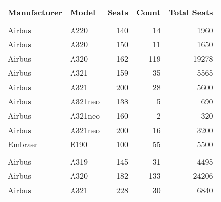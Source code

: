 
\begin{tabular}[t]{llrrr}
\toprule
Manufacturer & Model & Seats & Count & Total Seats\\
\midrule
\addlinespace[0.3em]
\multicolumn{5}{l}{\textbf{JetBlue}}\\
\hspace{1em}Airbus & A220 & 140 & 14 & 1960\\
\hspace{1em}Airbus & A320 & 150 & 11 & 1650\\
\hspace{1em}Airbus & A320 & 162 & 119 & 19278\\
\hspace{1em}Airbus & A321 & 159 & 35 & 5565\\
\hspace{1em}Airbus & A321 & 200 & 28 & 5600\\
\hspace{1em}Airbus & A321neo & 138 & 5 & 690\\
\hspace{1em}Airbus & A321neo & 160 & 2 & 320\\
\hspace{1em}Airbus & A321neo & 200 & 16 & 3200\\
\hspace{1em}Embraer & E190 & 100 & 55 & 5500\\
\addlinespace[0.3em]
\multicolumn{5}{l}{\textbf{Spirit}}\\
\hspace{1em}Airbus & A319 & 145 & 31 & 4495\\
\hspace{1em}Airbus & A320 & 182 & 133 & 24206\\
\hspace{1em}Airbus & A321 & 228 & 30 & 6840\\
\bottomrule
\end{tabular}

